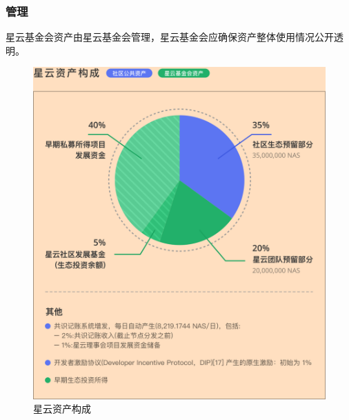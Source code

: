 \subsubsection{管理}

星云基金会资产由星云基金会管理，星云基金会应确保资产整体使用情况公开透明。

\begin{figure}
	\centering
	\includegraphics[width=1\textwidth]{../common/ch/assets.png}
	\caption{星云资产构成 \label{fig:assets}}
\end{figure}